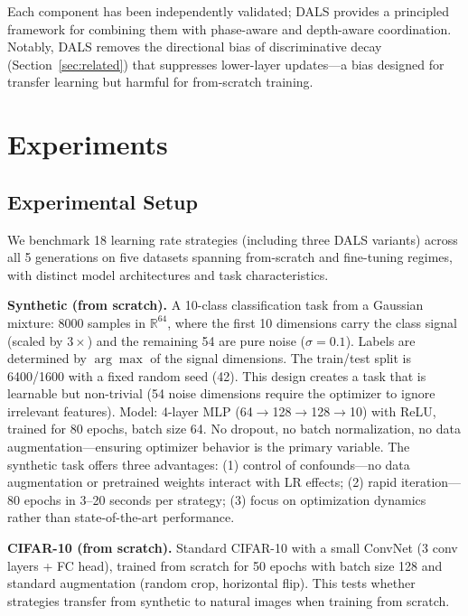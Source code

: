 \documentclass[a4paper,fleqn]{cas-dc}
\begin{document}
Each component has been independently validated; DALS provides a principled framework for combining them with phase-aware and depth-aware coordination. Notably, DALS removes the directional bias of discriminative decay (Section~\ref{sec:related}) that suppresses lower-layer updates---a bias designed for transfer learning but harmful for from-scratch training.

\section{Experiments}\label{sec:experiments}

\subsection{Experimental Setup}

We benchmark 18 learning rate strategies (including three DALS variants) across all 5 generations on five datasets spanning from-scratch and fine-tuning regimes, with distinct model architectures and task characteristics.

\textbf{Synthetic (from scratch).} A 10-class classification task from a Gaussian mixture: 8000 samples in $\mathbb{R}^{64}$, where the first 10 dimensions carry the class signal (scaled by $3\times$) and the remaining 54 are pure noise ($\sigma = 0.1$). Labels are determined by $\arg\max$ of the signal dimensions. The train/test split is 6400/1600 with a fixed random seed (42). This design creates a task that is learnable but non-trivial (54 noise dimensions require the optimizer to ignore irrelevant features). Model: 4-layer MLP (64$\to$128$\to$128$\to$10) with ReLU, trained for 80 epochs, batch size 64. No dropout, no batch normalization, no data augmentation---ensuring optimizer behavior is the primary variable. The synthetic task offers three advantages: (1) control of confounds---no data augmentation or pretrained weights interact with LR effects; (2) rapid iteration---80 epochs in 3--20 seconds per strategy; (3) focus on optimization dynamics rather than state-of-the-art performance.

\textbf{CIFAR-10 (from scratch).} Standard CIFAR-10 with a small ConvNet (3 conv layers + FC head), trained from scratch for 50 epochs with batch size 128 and standard augmentation (random crop, horizontal flip). This tests whether strategies transfer from synthetic to natural images when training from scratch.
\end{document}
